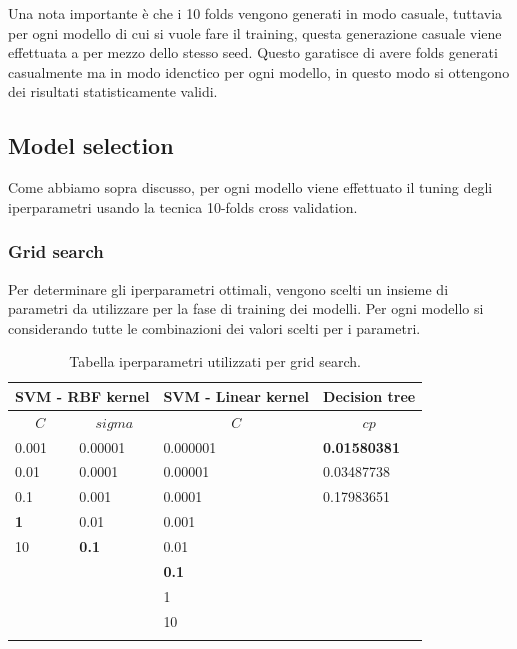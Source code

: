Una nota importante è che i 10 folds vengono generati in modo casuale, tuttavia per ogni modello di cui si vuole fare il training, questa generazione casuale viene effettuata a per mezzo dello stesso seed. Questo garatisce di avere folds generati casualmente ma in modo idenctico per ogni modello, in questo modo si ottengono dei risultati statisticamente validi.

\subsection{Model selection}
\label{sec:mode_selection}
Come abbiamo sopra discusso, per ogni modello viene effettuato il tuning degli iperparametri usando la tecnica 10-folds cross validation.

\subsubsection{Grid search}
\label{sec:grid-search}
Per determinare gli iperparametri ottimali, vengono scelti un insieme di parametri da utilizzare per la fase di training dei modelli. Per ogni modello si considerando tutte le combinazioni dei valori scelti per i parametri.

\begin{table}[H]
	
	\begin{center}
		
		\begin{tabular}{| l | l | l | l |}
			\hline
			\multicolumn{2}{|c|}{\textbf{SVM -  RBF kernel}} &
			\multicolumn{1}{|c|}{\textbf{SVM - Linear kernel}} &
			\multicolumn{1}{c|}{\textbf{Decision tree}}\\
			\hline
			\hline
			\multicolumn{1}{|c}{$C$} &
			\multicolumn{1}{c|}{$sigma$} &
			\multicolumn{1}{c|}{$C$ } &
			\multicolumn{1}{c|}{$cp$}\\
			\hline
			0.001	 & 0.00001    & 0.000001 & \textbf{0.01580381}\\
			0.01	  & 0.0001      &0.00001	& 0.03487738\\
			0.1	   & 0.001      	&0.0001	   & 0.17983651\\
			\textbf{1}			& 0.01      	  &0.001		  & \\
			10	   &\textbf{ 0.1 }     	  &0.01		   & \\
			&       		   	     &\textbf{0.1}			   & \\
			&       	  			 &1				& \\
			&       	  			 &10			   & \\
				  		   
			\hline
			
			\label{tab:iperp}
		\end{tabular}
		
	\end{center}
	\caption{Tabella iperparametri utilizzati per grid search.}
\end{table}

